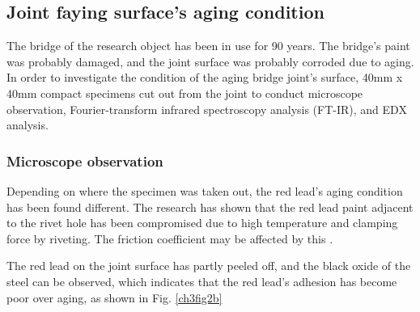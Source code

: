 \subsection{Joint faying surface's aging condition}

The bridge of the research object has been in use for 90 years. The bridge's paint was probably damaged, and the joint surface was probably corroded due to aging. In order to investigate the condition of the aging bridge joint's surface, 40mm x 40mm compact specimens cut out from the joint to conduct microscope observation, Fourier-transform infrared spectroscopy analysis (FT-IR), and \ac{EDX} analysis.

\subsubsection{Microscope observation} \label{ch3sec2-1}

Depending on where the specimen was taken out, the red lead's aging condition has been found different. The research has shown that the red lead paint adjacent to the rivet hole has been compromised due to high temperature and clamping force by riveting. The friction coefficient may be affected by this \cite{Leonetti2020RivetBridges}.

The red lead on the joint surface has partly peeled off, and the black oxide of the steel can be observed, which indicates that the red lead's adhesion has become poor over aging, as shown in Fig. \ref{ch3fig2b}

